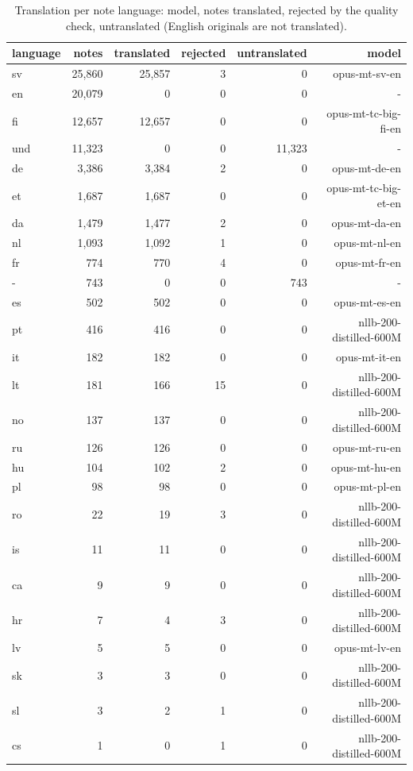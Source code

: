 \begin{table}[htbp]
\centering
\small
\caption{Translation per note language: model, notes translated, rejected by the quality check, untranslated (English originals are not translated).}
\label{tab:translation}
\begin{tabular}{lrrrrr}
\toprule
language & notes & translated & rejected & untranslated & model \\
\midrule
sv & 25{,}860 & 25{,}857 & 3 & 0 & opus-mt-sv-en \\
en & 20{,}079 & 0 & 0 & 0 & - \\
fi & 12{,}657 & 12{,}657 & 0 & 0 & opus-mt-tc-big-fi-en \\
und & 11{,}323 & 0 & 0 & 11{,}323 & - \\
de & 3{,}386 & 3{,}384 & 2 & 0 & opus-mt-de-en \\
et & 1{,}687 & 1{,}687 & 0 & 0 & opus-mt-tc-big-et-en \\
da & 1{,}479 & 1{,}477 & 2 & 0 & opus-mt-da-en \\
nl & 1{,}093 & 1{,}092 & 1 & 0 & opus-mt-nl-en \\
fr & 774 & 770 & 4 & 0 & opus-mt-fr-en \\
- & 743 & 0 & 0 & 743 & - \\
es & 502 & 502 & 0 & 0 & opus-mt-es-en \\
pt & 416 & 416 & 0 & 0 & nllb-200-distilled-600M \\
it & 182 & 182 & 0 & 0 & opus-mt-it-en \\
lt & 181 & 166 & 15 & 0 & nllb-200-distilled-600M \\
no & 137 & 137 & 0 & 0 & nllb-200-distilled-600M \\
ru & 126 & 126 & 0 & 0 & opus-mt-ru-en \\
hu & 104 & 102 & 2 & 0 & opus-mt-hu-en \\
pl & 98 & 98 & 0 & 0 & opus-mt-pl-en \\
ro & 22 & 19 & 3 & 0 & nllb-200-distilled-600M \\
is & 11 & 11 & 0 & 0 & nllb-200-distilled-600M \\
ca & 9 & 9 & 0 & 0 & nllb-200-distilled-600M \\
hr & 7 & 4 & 3 & 0 & nllb-200-distilled-600M \\
lv & 5 & 5 & 0 & 0 & opus-mt-lv-en \\
sk & 3 & 3 & 0 & 0 & nllb-200-distilled-600M \\
sl & 3 & 2 & 1 & 0 & nllb-200-distilled-600M \\
cs & 1 & 0 & 1 & 0 & nllb-200-distilled-600M \\
\bottomrule
\end{tabular}
\end{table}
